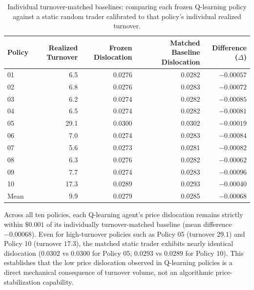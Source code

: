 \documentclass[11pt,a4paper]{article}
\theoremstyle{definition}\newtheorem{definition}[theorem]{Definition}
\theoremstyle{remark}\newtheorem{remark}[theorem]{Remark}
\begin{document}
\begin{table}[htbp]
\centering\small
\caption{Individual turnover-matched baselines: comparing each frozen Q-learning policy against a static random trader calibrated to that policy's individual realized turnover.}
\label{tab:supp_individual_matched}
\begin{tabular}{lrrrr}
\toprule
Policy & Realized Turnover & Frozen Dislocation & Matched Baseline Dislocation & Difference ($\Delta$) \\
\midrule
01 & 6.5 & 0.0276 & 0.0282 & $-0.00057$ \\
02 & 6.8 & 0.0276 & 0.0283 & $-0.00072$ \\
03 & 6.2 & 0.0274 & 0.0282 & $-0.00085$ \\
04 & 6.5 & 0.0274 & 0.0282 & $-0.00081$ \\
05 & 29.1 & 0.0300 & 0.0302 & $-0.00019$ \\
06 & 7.0 & 0.0274 & 0.0283 & $-0.00084$ \\
07 & 5.6 & 0.0273 & 0.0281 & $-0.00082$ \\
08 & 6.3 & 0.0276 & 0.0282 & $-0.00062$ \\
09 & 7.7 & 0.0274 & 0.0283 & $-0.00096$ \\
10 & 17.3 & 0.0289 & 0.0293 & $-0.00040$ \\
\midrule
Mean & 9.9 & 0.0279 & 0.0285 & $-0.00068$ \\
\bottomrule
\end{tabular}
\end{table}

Across all ten policies, each Q-learning agent's price dislocation remains strictly within $\$0.001$ of its individually turnover-matched baseline (mean difference $-0.00068$). Even for high-turnover policies such as Policy 05 (turnover $29.1$) and Policy 10 (turnover $17.3$), the matched static trader exhibits nearly identical dislocation ($0.0302$ vs $0.0300$ for Policy 05; $0.0293$ vs $0.0289$ for Policy 10). This establishes that the low price dislocation observed in Q-learning policies is a direct mechanical consequence of turnover volume, not an algorithmic price-stabilization capability.
\end{document}
